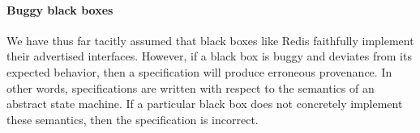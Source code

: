 \paragraph{Buggy black boxes}
We have thus far tacitly assumed that black boxes like Redis faithfully
implement their advertised interfaces. However, if a black box is buggy and
deviates from its expected behavior, then a \watprovenance{} specification will
produce erroneous provenance. In other words, \watprovenance{} specifications
are written with respect to the semantics of an abstract state machine. If a
particular black box does not concretely implement these semantics, then the
\watprovenance{} specification is incorrect.

